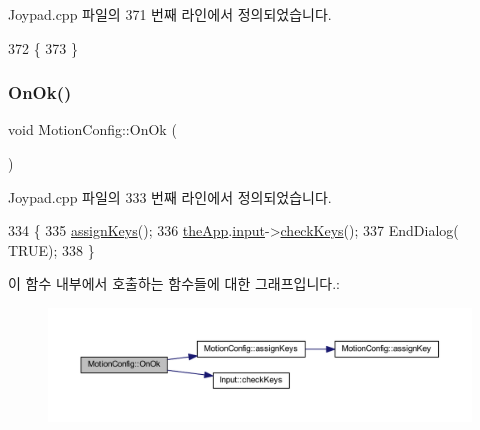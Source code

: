 Joypad.\+cpp 파일의 371 번째 라인에서 정의되었습니다.


\begin{DoxyCode}
372 \{
373 \}
\end{DoxyCode}
\mbox{\label{class_motion_config_a252355cb318ff1f62c63d89941b2758e}} 
\subsubsection{\texorpdfstring{On\+Ok()}{OnOk()}}
{\footnotesize\ttfamily void Motion\+Config\+::\+On\+Ok (\begin{DoxyParamCaption}{ }\end{DoxyParamCaption})\hspace{0.3cm}{\ttfamily [protected]}}



Joypad.\+cpp 파일의 333 번째 라인에서 정의되었습니다.


\begin{DoxyCode}
334 \{
335   \mbox{\hyperlink{class_motion_config_a73d6bc239e8abd59b68f23ddaaf6daf4}{assignKeys}}();
336   \mbox{\hyperlink{_v_b_a_8cpp_a8095a9d06b37a7efe3723f3218ad8fb3}{theApp}}.\mbox{\hyperlink{class_v_b_a_aaab971cb5d67a69e1a26502d15a4dc60}{input}}->\mbox{\hyperlink{class_input_a91418a5762e6e50aa4f59e4ce92d2dfa}{checkKeys}}();
337   EndDialog( TRUE);
338 \}
\end{DoxyCode}
이 함수 내부에서 호출하는 함수들에 대한 그래프입니다.\+:
\nopagebreak
\begin{figure}[H]
\begin{center}
\leavevmode
\includegraphics[width=350pt]{class_motion_config_a252355cb318ff1f62c63d89941b2758e_cgraph}
\end{center}
\end{figure}
\mbox{\label{class_motion_config_ac787a62c63e00f55582bb4695bbd04d6}} 
